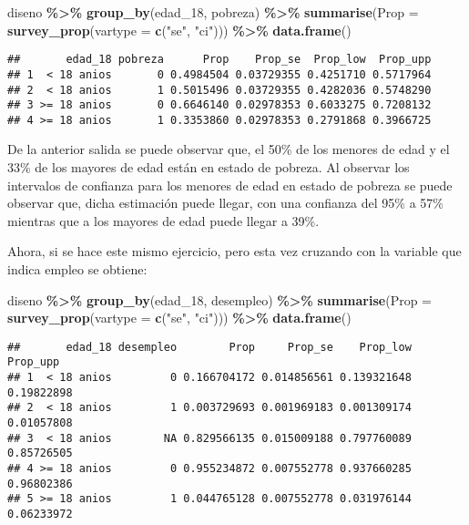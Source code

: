 \documentclass[
  12pt,
]{book}
\newenvironment{Shaded}{\begin{snugshade}}{\end{snugshade}}
\newcommand{\AttributeTok}[1]{\textcolor[rgb]{0.13,0.29,0.53}{#1}}
\newcommand{\FunctionTok}[1]{\textcolor[rgb]{0.13,0.29,0.53}{\textbf{#1}}}
\newcommand{\NormalTok}[1]{#1}
\newcommand{\SpecialCharTok}[1]{\textcolor[rgb]{0.81,0.36,0.00}{\textbf{#1}}}
\newcommand{\StringTok}[1]{\textcolor[rgb]{0.31,0.60,0.02}{#1}}
\begin{document}
\begin{Shaded}
\begin{Highlighting}[]
\NormalTok{diseno }\SpecialCharTok{\%\textgreater{}\%} \FunctionTok{group\_by}\NormalTok{(edad\_18, pobreza) }\SpecialCharTok{\%\textgreater{}\%} 
           \FunctionTok{summarise}\NormalTok{(}\AttributeTok{Prop =} \FunctionTok{survey\_prop}\NormalTok{(}\AttributeTok{vartype =}  \FunctionTok{c}\NormalTok{(}\StringTok{"se"}\NormalTok{, }\StringTok{"ci"}\NormalTok{))) }\SpecialCharTok{\%\textgreater{}\%}
           \FunctionTok{data.frame}\NormalTok{()}
\end{Highlighting}
\end{Shaded}

\begin{verbatim}
##       edad_18 pobreza      Prop    Prop_se  Prop_low  Prop_upp
## 1  < 18 anios       0 0.4984504 0.03729355 0.4251710 0.5717964
## 2  < 18 anios       1 0.5015496 0.03729355 0.4282036 0.5748290
## 3 >= 18 anios       0 0.6646140 0.02978353 0.6033275 0.7208132
## 4 >= 18 anios       1 0.3353860 0.02978353 0.2791868 0.3966725
\end{verbatim}

De la anterior salida se puede observar que, el 50\% de los menores de edad y el 33\% de los mayores de edad están en estado de pobreza. Al observar los intervalos de confianza para los menores de edad en estado de pobreza se puede observar que, dicha estimación puede llegar, con una confianza del 95\% a 57\% mientras que a los mayores de edad puede llegar a 39\%.

Ahora, si se hace este mismo ejercicio, pero esta vez cruzando con la variable que indica empleo se obtiene:

\begin{Shaded}
\begin{Highlighting}[]
\NormalTok{diseno }\SpecialCharTok{\%\textgreater{}\%} \FunctionTok{group\_by}\NormalTok{(edad\_18, desempleo) }\SpecialCharTok{\%\textgreater{}\%} 
           \FunctionTok{summarise}\NormalTok{(}\AttributeTok{Prop =} \FunctionTok{survey\_prop}\NormalTok{(}\AttributeTok{vartype =}  \FunctionTok{c}\NormalTok{(}\StringTok{"se"}\NormalTok{, }\StringTok{"ci"}\NormalTok{))) }\SpecialCharTok{\%\textgreater{}\%}
           \FunctionTok{data.frame}\NormalTok{()}
\end{Highlighting}
\end{Shaded}

\begin{verbatim}
##       edad_18 desempleo        Prop     Prop_se    Prop_low   Prop_upp
## 1  < 18 anios         0 0.166704172 0.014856561 0.139321648 0.19822898
## 2  < 18 anios         1 0.003729693 0.001969183 0.001309174 0.01057808
## 3  < 18 anios        NA 0.829566135 0.015009188 0.797760089 0.85726505
## 4 >= 18 anios         0 0.955234872 0.007552778 0.937660285 0.96802386
## 5 >= 18 anios         1 0.044765128 0.007552778 0.031976144 0.06233972
\end{verbatim}
\end{document}
